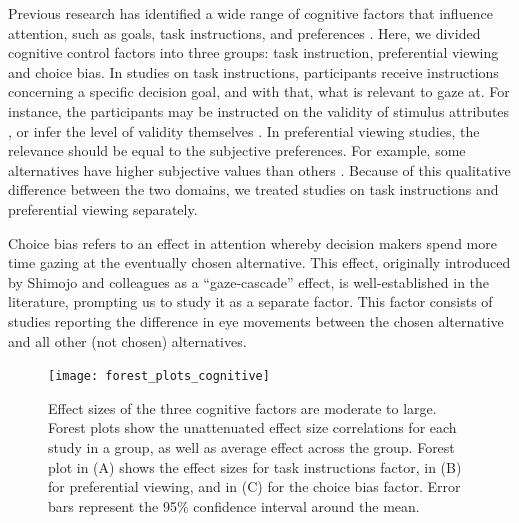 Previous research has identified a wide range of cognitive factors that influence attention, such as goals, task instructions, and preferences \citep[for a review see][]{orquin2013a}. Here, we divided cognitive control factors into three groups: task instruction, preferential viewing and choice bias. In studies on task instructions, participants receive instructions concerning a specific decision goal, and with that, what is relevant to gaze at. For instance, the participants may be instructed on the validity of stimulus attributes \citep{krefeld-schwalb2019a}, or infer the level of validity themselves \citep{bialkova2014a}. In preferential viewing studies, the relevance should be equal to the subjective preferences. For example, some alternatives have higher subjective values than others \citep{kim2012a}. Because of this qualitative difference between the two domains, we treated studies on task instructions and preferential viewing separately. 

Choice bias refers to an effect in attention whereby decision makers spend more time gazing at the eventually chosen alternative. This effect, originally introduced by Shimojo and colleagues \citep{shimojo2003a} as a ``gaze-cascade'' effect, is well-established in the literature, prompting us to study it as a separate factor. This factor consists of studies reporting the difference in eye movements between the chosen alternative and all other (not chosen) alternatives. 


\begin{figure}[!h]
\texttt{[image: forest\_plots\_cognitive]}
\centering
\caption{Effect sizes of the three cognitive factors are moderate to large. Forest plots show the unattenuated effect size correlations for each study in a group, as well as average effect across the group. Forest plot in (A) shows the effect sizes for task instructions factor, in (B) for preferential viewing, and in (C) for the choice bias factor. Error bars represent the 95\% confidence interval around the mean.}
\label{fig:forest_plots_cognitive}
\end{figure}



